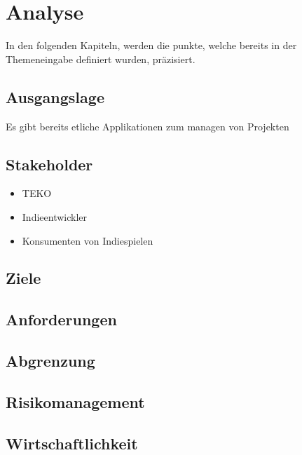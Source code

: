 \section{Analyse}
In den folgenden Kapiteln, werden die punkte, welche bereits in der Themeneingabe
definiert wurden, präzisiert.

\subsection{Ausgangslage}
Es gibt bereits etliche Applikationen zum managen von Projekten
\newpage
\subsection{Stakeholder}
\begin{itemize}
    \item TEKO
    \item Indieentwickler
    \item Konsumenten von Indiespielen
\end{itemize}
\newpage
\subsection{Ziele}
\newpage
\subsection{Anforderungen}
\newpage
\subsection{Abgrenzung}
\newpage
\subsection{Risikomanagement}
\newpage
\subsection{Wirtschaftlichkeit}